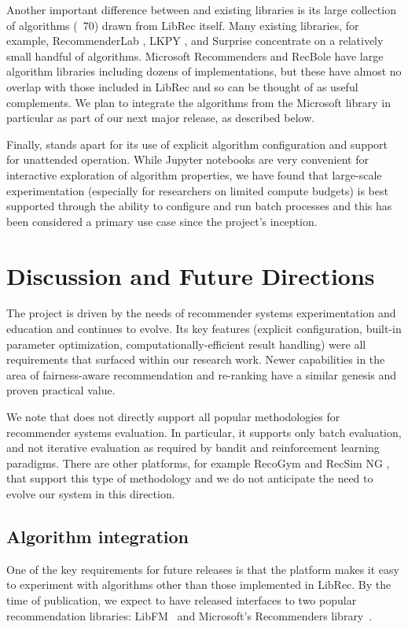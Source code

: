 Another important difference between \libauto{} and existing libraries is its large collection of algorithms (~70) drawn from LibRec itself. Many existing libraries, for example, RecommenderLab \cite{hahsler2015recommenderlab}, LKPY \cite{LensKit2020}, and Surprise \cite{Hug2020} concentrate on a relatively small handful of algorithms. Microsoft Recommenders \cite{MicrosoftRecommenders} and RecBole \cite{recbole} have large algorithm libraries including dozens of implementations, but these have almost no overlap with those included in LibRec and so can be thought of as useful complements. We plan to integrate the algorithms from the Microsoft library in particular as part of our next major release, as described below.

Finally, \libauto{} stands apart for its use of explicit algorithm configuration and support for unattended operation. While Jupyter notebooks are very convenient for interactive exploration of algorithm properties, we have found that large-scale experimentation (especially for researchers on limited compute budgets) is best supported through the ability to configure and run batch processes and this has been considered a primary use case since the project's inception.

\section{Discussion and Future Directions}
The \libauto{} project is driven by the needs of recommender systems experimentation and education and continues to evolve. Its key features (explicit configuration, built-in parameter optimization, computationally-efficient result handling) were all requirements that surfaced within our research work. Newer capabilities in the area of fairness-aware recommendation and re-ranking have a similar genesis and proven practical value. 

We note that \libauto{} does not directly support all popular methodologies for recommender systems evaluation. In particular, it supports only batch evaluation, and not iterative evaluation as required by bandit and reinforcement learning paradigms. There are other platforms, for example RecoGym \cite{rohde2018recogym} and RecSim NG \cite{mladenov2021recsim}, that support this type of methodology and we do not anticipate the need to evolve our system in this direction. 

\subsection{Algorithm integration}
One of the key requirements for future releases is that the platform makes it easy to experiment with algorithms other than those implemented in LibRec. By the time of publication, we expect to have released interfaces to two popular recommendation libraries:  LibFM~\cite{rendle2012factorization} and Microsoft's Recommenders library~\cite{argyriou2020microsoft}. 

